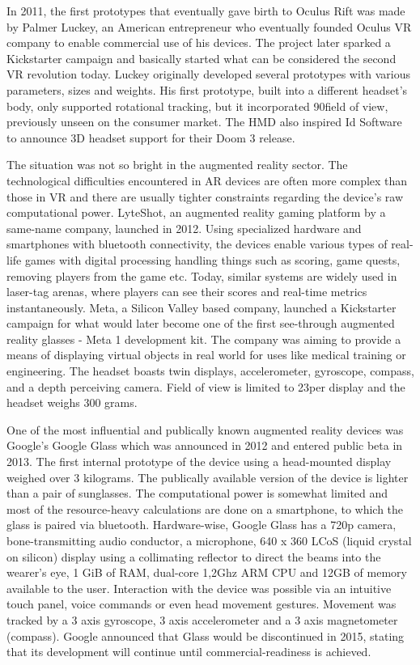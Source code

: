 \documentclass[12pt, a4paper]{article}
\begin{document}
In 2011, the first prototypes that eventually gave birth to Oculus Rift was made by Palmer Luckey, an American entrepreneur who eventually founded Oculus VR company to enable commercial use of his devices. The project later sparked a Kickstarter campaign and basically started what can be considered the second VR revolution today. Luckey originally developed several prototypes with various parameters, sizes and weights. His first prototype, built into a different headset’s body, only supported rotational tracking, but it incorporated 90\degree field of view, previously unseen on the consumer market. The HMD also inspired Id Software to announce 3D headset support for their Doom 3 release.

The situation was not so bright in the augmented reality sector. The technological difficulties encountered in AR devices are often more complex than those in VR and there are usually tighter constraints regarding the device’s raw computational power. LyteShot, an augmented reality gaming platform by a same-name company, launched in 2012. Using specialized hardware and smartphones with bluetooth connectivity, the devices enable various types of real-life games with digital processing handling things such as scoring, game quests, removing players from the game etc. Today, similar systems are widely used in laser-tag arenas, where players can see their scores and real-time metrics instantaneously. Meta, a Silicon Valley based company, launched a Kickstarter campaign for what would later become one of the first see-through augmented reality glasses - Meta 1 development kit. The company was aiming to provide a means of displaying virtual objects in real world for uses like medical training or engineering. The headset boasts twin displays, accelerometer, gyroscope, compass, and a depth perceiving camera. Field of view is limited to 23\degree per display and the headset weighs 300 grams.

One of the most influential and publically known augmented reality devices was Google’s Google Glass which was announced in 2012 and entered public beta in 2013. The first internal prototype of the device using a head-mounted display weighed over 3 kilograms. The publically available version of the device is lighter than a pair of sunglasses. The computational power is somewhat limited and most of the resource-heavy calculations are done on a smartphone, to which the glass is paired via bluetooth. Hardware-wise, Google Glass has a 720p camera, bone-transmitting audio conductor, a microphone, 640 x 360 LCoS (liquid crystal on silicon) display using a collimating reflector to direct the beams into the wearer’s eye, 1 GiB of RAM, dual-core 1,2Ghz ARM CPU and 12GB of memory available to the user. Interaction with the device was possible via an intuitive touch panel, voice commands or even head movement gestures. Movement was tracked by a 3 axis gyroscope, 3 axis accelerometer and a 3 axis magnetometer (compass). Google announced that Glass would be discontinued in 2015, stating that its development will continue until commercial-readiness is achieved.
\end{document}

